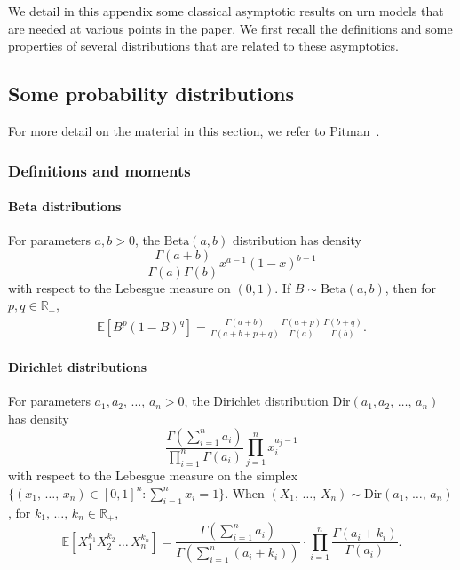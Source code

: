 \documentclass[AHL,Unicode,longabstracts,published]{cedram}
\newcommand{\Ec}[1]{\mathbb{E} \left[#1\right]}
\newcommand{\Betal}{\mathrm{Beta}}
\newcommand{\Dir}{\mathrm{Dir}}
\newcommand{\R}{\mathbb{R}}
\newcommand{\R}{\mathbb{R}}
\begin{document}
We detail in this appendix some classical asymptotic results on urn models that are needed at various points in the paper. We first recall the definitions and some properties of several distributions that are related to these asymptotics.

\subsection{Some probability distributions}

For more detail on the material in this section, we refer to Pitman~\cite{PitmanStFl}.

\subsubsection{Definitions and moments}

\paragraph{Beta distributions}
For parameters $a,b >0$, the $\Betal(a,b)$ distribution has density
\[
\frac{\Gamma(a+b)}{\Gamma(a) \Gamma(b)} x^{a-1} (1-x)^{b-1}
\]
with respect to the Lebesgue measure on $(0,1)$. If $B \sim \Betal(a,b)$, then for $p,q \in \R_+,$
\begin{align}\label{eq:moments beta}
\Ec{B^p(1-B)^q}=\frac{\Gamma(a+b)}{\Gamma(a+b+p+q)}\frac{\Gamma(a+p)}{\Gamma(a)}\frac{\Gamma(b+q)}{\Gamma(b)}.
\end{align}



\paragraph{Dirichlet distributions}
For parameters $a_1, a_2,\,\ldots,\,a_n > 0$, the Dirichlet distribution $\Dir(a_1, a_2,\,\ldots,\,a_n)$ has density
\[
\frac{\Gamma\left(\sum\limits_{i=1}^n a_i\right)}{\prod\limits_{i=1}^n \Gamma(a_i)} \prod_{j=1}^{n} x_i^{a_j-1}
\]
with respect to the Lebesgue measure on the simplex $\{(x_1,\,\ldots,\,x_n) \in [0,1]^n: \sum_{i=1}^n x_i = 1\}$. When $(X_1,\,\dots,\, X_n)\sim \Dir(a_1,\,\dots,\,a_n)$, for $k_1,\,\ldots,\,k_n \in \R_+$,
\begin{equation}\label{moments dirichlet}
\Ec{X_1^{k_1}X_2^{k_2}\,\dots\,X_n^{k_n}}= \frac{\Gamma\left(\sum\limits_{i=1}^na_i\right)}{\Gamma\left(\sum\limits_{i=1}^n\left(a_i+k_i\right)\right)}\cdot \prod\limits_{i=1}^n\frac{\Gamma\left(a_i+k_i\right)}{\Gamma(a_i)}.
\end{equation}
\end{document}
